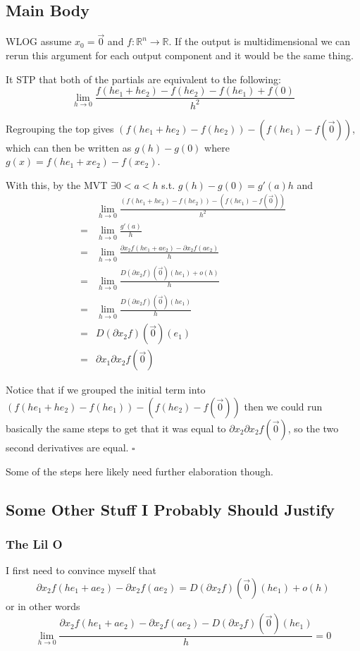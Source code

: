 \documentclass[12pt]{article}
\newcommand{\R}{\mathbb{R}}
\begin{document}
\subsection{Main Body}

WLOG assume $x_0=\vec{0}$ and $f: \R^n \to \R$.
If the output is multidimensional we can rerun this argument
for each output component and it would be the same thing.

It STP that both of the partials are equivalent to the following:
\[\lim_{h \to 0} \frac{f(he_1+he_2)-f(he_2)-f(he_1)+f(0)}{h^2}\]

Regrouping the top gives $(f(he_1+he_2)-f(he_2))-(f(he_1)-f(\vec{0}))$,
which can then be written as $g(h)-g(0)$ where $g(x)=f(he_1+xe_2)-f(xe_2)$.

With this, by the MVT $\exists 0 < a < h$ s.t. $g(h)-g(0)=g'(a)h$ and
\begin{align*}
  & \lim_{h \to 0} \frac{(f(he_1+he_2)-f(he_2))-(f(he_1)-f(\vec{0}))}{h^2} \\
  ={} & \lim_{h \to 0} \frac{g'(a)}{h} \\
  ={} & \lim_{h \to 0} \frac{\partial x_2 f(he_1+ae_2)-\partial x_2 f(ae_2)}{h} \\
  ={} & \lim_{h \to 0} \frac{D(\partial x_2 f)(\vec{0})(he_1)+o(h)}{h} \\
  ={} & \lim_{h \to 0} \frac{D(\partial x_2 f)(\vec{0})(he_1)}{h} \\
  ={} & D(\partial x_2 f)(\vec{0})(e_1) \\
  ={} & \partial x_1 \partial x_2 f(\vec{0})
\end{align*}

Notice that if we grouped the initial term into $(f(he_1+he_2)-f(he_1))-(f(he_2)-f(\vec{0}))$
then we could run basically the same steps to get that it was equal to $\partial x_2 \partial x_2 f(\vec{0})$,
so the two second derivatives are equal. $\square$

Some of the steps here likely need further elaboration though.

\subsection{Some Other Stuff I Probably Should Justify}

\subsubsection{The Lil O}

I first need to convince myself that
\[\partial x_2 f(he_1+ae_2)-\partial x_2 f(ae_2)
=D(\partial x_2 f)(\vec{0})(he_1)+o(h)\]
or in other words
\[\lim_{h \to 0} \frac{\partial x_2 f(he_1+ae_2)-\partial x_2 f(ae_2)-D(\partial x_2 f)(\vec{0})(he_1)}{h}=0\]
\end{document}
